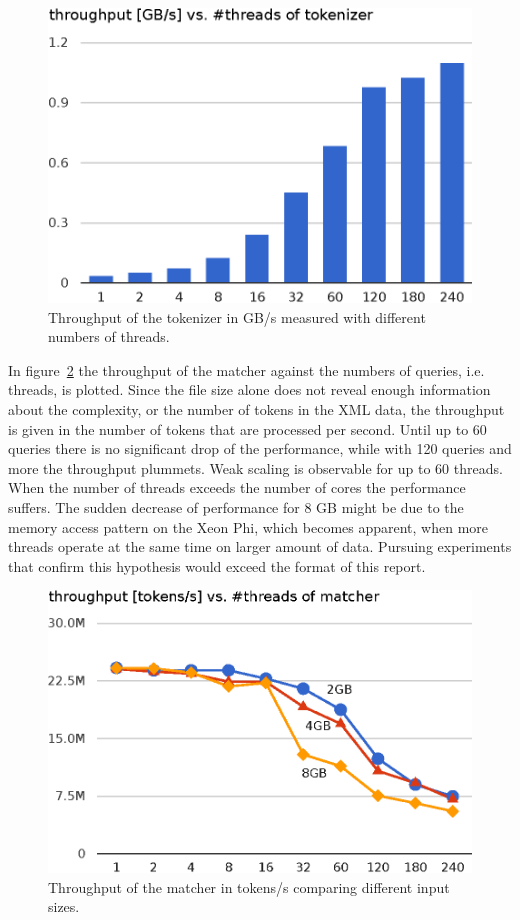 \begin{figure}[h]\centering
  \includegraphics[scale=.66]{img/tokenizer_throughput_2.eps}
  \caption{Throughput of the tokenizer in GB/s measured with different numbers of threads.
  \label{tokenizer_throughput}}
\end{figure}

In figure~\ref{matcher_throughput} the throughput of the matcher against the numbers of queries, i.e. threads, is plotted. Since the file size alone does not reveal enough information about the complexity, or the number of tokens in the XML data, the throughput is given in the number of tokens that are processed per second. Until up to 60 queries there is no significant drop of the performance, while with 120 queries and more the throughput plummets. Weak scaling is observable for up to 60 threads. When the number of threads exceeds the number of cores the performance suffers. The sudden decrease of performance for 8 GB might be due to the memory access pattern on the Xeon Phi, which becomes apparent, when more threads operate at the same time on larger amount of data. Pursuing experiments that confirm this hypothesis would exceed the format of this report. 

\begin{figure}[h]\centering
  \includegraphics[scale=.66]{img/matcher_throughput_2.eps}
  \caption{Throughput of the matcher in tokens/s comparing different input sizes. \label{matcher_throughput}}
\end{figure}

